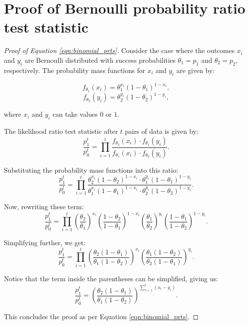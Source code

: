 \documentclass[magisterska, english]{pwr_wmat_praca_dyplomowa}
\theoremstyle{plain}
\numberwithin{theorem}{chapter}
\theoremstyle{definition}
\numberwithin{theorem}{chapter}
\begin{document}
\section{Proof of Bernoulli probability ratio test statistic}\label{proof:bernoulli_prts}
\begin{proof}[Proof of Equation \eqref{eqn:binomial_prts}]
	
	Consider the case where the outcomes \(x_i\) and \(y_i\) are Bernoulli distributed with success probabilities \(\theta_1 = p_1\) and \(\theta_2 = p_2\), respectively. The probability mass functions for \(x_i\) and \(y_i\) are given by:
	
	\[
	f_{\theta_1}(x_i) = \theta_1^{x_i}(1-\theta_1)^{1-x_i},
	\]
	\[
	f_{\theta_2}(y_i) = \theta_2^{y_i}(1-\theta_2)^{1-y_i},
	\]
	
	where \(x_i\) and \(y_i\) can take values \(0\) or \(1\).
	
	The likelihood ratio test statistic after \(t\) pairs of data is given by:
	\[
	\frac{p_1^t}{p_0^t} = \prod_{i=1}^{t} \frac{f_{\theta_2}(x_i) \cdot f_{\theta_1}(y_i)}{f_{\theta_1}(x_i) \cdot f_{\theta_2}(y_i)}.
	\]
	
	Substituting the probability mass functions into this ratio:
	\[
	\frac{p_1^t}{p_0^t} = \prod_{i=1}^{t} \frac{\theta_2^{x_i}(1-\theta_2)^{1-x_i} \cdot \theta_1^{y_i}(1-\theta_1)^{1-y_i}}{\theta_1^{x_i}(1-\theta_1)^{1-x_i} \cdot \theta_2^{y_i}(1-\theta_2)^{1-y_i}}.
	\]
	
	Now, rewriting these term:
	\[
	\frac{p_1^t}{p_0^t} = \prod_{i=1}^{t} \left(\frac{\theta_2}{\theta_1}\right)^{x_i} \left(\frac{1-\theta_2}{1-\theta_1}\right)^{1-x_i}  \left(\frac{\theta_1}{\theta_2}\right)^{y_i} \left(\frac{1-\theta_1}{1-\theta_2}\right)^{1-y_i}.
	\]
	
	Simplifying further, we get:
	\[
	\frac{p_1^t}{p_0^t} = \prod_{i=1}^{t} \left(\frac{\theta_2(1-\theta_1)}{\theta_1(1-\theta_2)}\right)^{x_i}  \left(\frac{\theta_1(1-\theta_2)}{\theta_2(1-\theta_1)}\right)^{y_i}.
	\]
	
	Notice that the term inside the parentheses can be simplified, giving us:
	\[
	\frac{p_1^t}{p_0^t} = \left(\frac{\theta_2(1-\theta_1)}{\theta_1(1-\theta_2)}\right)^{\sum_{i=1}^{t} (x_i - y_i)}.
	\]
	
	This concludes the proof as per Equation \eqref{eqn:binomial_prts}.
\end{proof}








	
\end{document}

